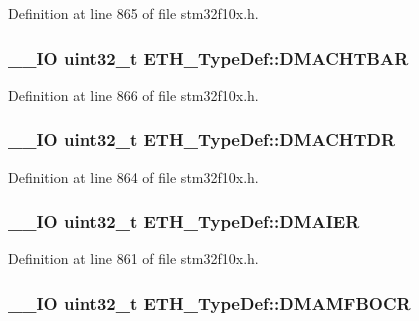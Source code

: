 Definition at line 865 of file stm32f10x.\-h.

\hypertarget{struct_e_t_h___type_def_abb2eba5ee2a1621abeeb59e3aadc0318}{
\subsubsection[{D\-M\-A\-C\-H\-T\-B\-A\-R}]{\setlength{\rightskip}{0pt plus 5cm}\-\_\-\-\_\-\-I\-O {\bf uint32\-\_\-t} E\-T\-H\-\_\-\-Type\-Def\-::\-D\-M\-A\-C\-H\-T\-B\-A\-R}}\label{struct_e_t_h___type_def_abb2eba5ee2a1621abeeb59e3aadc0318}


Definition at line 866 of file stm32f10x.\-h.

\hypertarget{struct_e_t_h___type_def_ab02310e389320a383022b666af621ba9}{
\subsubsection[{D\-M\-A\-C\-H\-T\-D\-R}]{\setlength{\rightskip}{0pt plus 5cm}\-\_\-\-\_\-\-I\-O {\bf uint32\-\_\-t} E\-T\-H\-\_\-\-Type\-Def\-::\-D\-M\-A\-C\-H\-T\-D\-R}}\label{struct_e_t_h___type_def_ab02310e389320a383022b666af621ba9}


Definition at line 864 of file stm32f10x.\-h.

\hypertarget{struct_e_t_h___type_def_af35764e78c9cb2a8743822f63134ef42}{
\subsubsection[{D\-M\-A\-I\-E\-R}]{\setlength{\rightskip}{0pt plus 5cm}\-\_\-\-\_\-\-I\-O {\bf uint32\-\_\-t} E\-T\-H\-\_\-\-Type\-Def\-::\-D\-M\-A\-I\-E\-R}}\label{struct_e_t_h___type_def_af35764e78c9cb2a8743822f63134ef42}


Definition at line 861 of file stm32f10x.\-h.

\hypertarget{struct_e_t_h___type_def_aa031754e61b60bbbec393be19fb30036}{
\subsubsection[{D\-M\-A\-M\-F\-B\-O\-C\-R}]{\setlength{\rightskip}{0pt plus 5cm}\-\_\-\-\_\-\-I\-O {\bf uint32\-\_\-t} E\-T\-H\-\_\-\-Type\-Def\-::\-D\-M\-A\-M\-F\-B\-O\-C\-R}}\label{struct_e_t_h___type_def_aa031754e61b60bbbec393be19fb30036}


